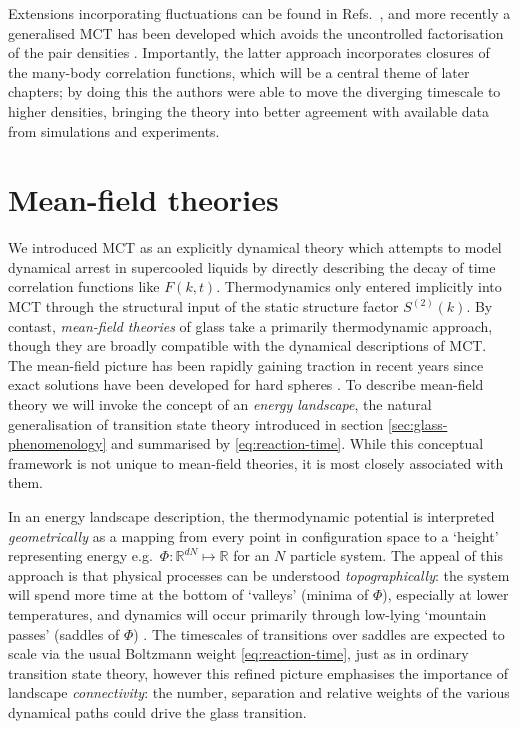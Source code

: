 \documentclass[11pt,twoside]{report}
\begin{document}
Extensions incorporating fluctuations can be found in Refs.\ \cite{BiroliPRL2006,SzamelPTEP2013}, and more recently a generalised MCT has been developed which avoids the uncontrolled factorisation of the pair densities \cite{JanssenPRL2015,JanssenFP2018}.
Importantly, the latter approach incorporates closures of the many-body correlation functions, which will be a central theme of later chapters; by doing this the authors were able to move the diverging timescale to higher densities, bringing the theory into better agreement with available data from simulations and experiments.

\section{Mean-field theories}
\label{sec:mean-field-glass}

We introduced MCT as an explicitly dynamical theory which attempts to model dynamical arrest in supercooled liquids by directly describing the decay of time correlation functions like $F(k, t)$.
Thermodynamics only entered implicitly into MCT through the structural input of the static structure factor $S^{(2)}(k)$.
By contast, \emph{mean-field theories} of glass take a primarily thermodynamic approach, though they are broadly compatible with the dynamical descriptions of MCT.
The mean-field picture has been rapidly gaining traction in recent years since exact solutions have been developed for hard spheres \cite{ParisiRMP2010,KurchanJSM2012,KurchanJPCB2013,CharbonneauNC2014,CharbonneauJSM2014}.
To describe mean-field theory we will invoke the concept of an \emph{energy landscape}, the natural generalisation of transition state theory introduced in section \ref{sec:glass-phenomenology} and summarised by \eqref{eq:reaction-time}.
While this conceptual framework is not unique to mean-field theories, it is most closely associated with them.

In an energy landscape description, the thermodynamic potential is interpreted \emph{geometrically} as a mapping from every point in configuration space to a `height' representing energy e.g.\ $\Phi: \mathbb{R}^{dN} \mapsto \mathbb{R}$ for an $N$ particle system.
The appeal of this approach is that physical processes can be understood \emph{topographically}: the system will spend more time at the bottom of `valleys' (minima of $\Phi$), especially at lower temperatures, and dynamics will occur primarily through low-lying `mountain passes' (saddles of $\Phi$) \cite{StillingerS1995}.
The timescales of transitions over saddles are expected to scale via the usual Boltzmann weight \eqref{eq:reaction-time}, just as in ordinary transition state theory, however this refined picture emphasises the importance of landscape \emph{connectivity}: the number, separation and relative weights of the various dynamical paths could drive the glass transition.
\end{document}
